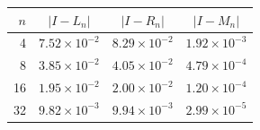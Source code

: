 \begin{tabular}{rccc}
\toprule
$n$ & $\lvert I-L_n\rvert$ & $\lvert I-R_n\rvert$ & $\lvert I-M_n\rvert$ \\
\midrule
4 & $7.52\times10^{-2}$ & $8.29\times10^{-2}$ & $1.92\times10^{-3}$ \\
8 & $3.85\times10^{-2}$ & $4.05\times10^{-2}$ & $4.79\times10^{-4}$ \\
16 & $1.95\times10^{-2}$ & $2.00\times10^{-2}$ & $1.20\times10^{-4}$ \\
32 & $9.82\times10^{-3}$ & $9.94\times10^{-3}$ & $2.99\times10^{-5}$ \\
\bottomrule
\end{tabular}
